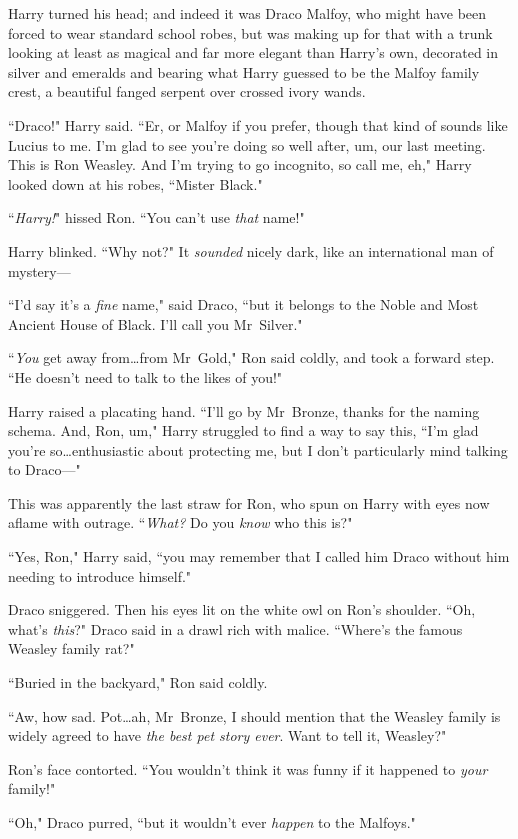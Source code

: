 Harry turned his head; and indeed it was Draco Malfoy, who might have been forced to wear standard school robes, but was making up for that with a trunk looking at least as magical and far more elegant than Harry's own, decorated in silver and emeralds and bearing what Harry guessed to be the Malfoy family crest, a beautiful fanged serpent over crossed ivory wands.

``Draco!" Harry said. ``Er, or Malfoy if you prefer, though that kind of sounds like Lucius to me. I'm glad to see you're doing so well after, um, our last meeting. This is Ron Weasley. And I'm trying to go incognito, so call me, eh," Harry looked down at his robes, ``Mister Black."

``\emph{Harry!}" hissed Ron. ``You can't use \emph{that} name!"

Harry blinked. ``Why not?" It \emph{sounded} nicely dark, like an international man of mystery—

``I'd say it's a \emph{fine} name," said Draco, ``but it belongs to the Noble and Most Ancient House of Black. I'll call you Mr~Silver."

``\emph{You} get away from…from Mr~Gold," Ron said coldly, and took a forward step. ``He doesn't need to talk to the likes of you!"

Harry raised a placating hand. ``I'll go by Mr~Bronze, thanks for the naming schema. And, Ron, um," Harry struggled to find a way to say this, ``I'm glad you're so…enthusiastic about protecting me, but I don't particularly mind talking to Draco—"

This was apparently the last straw for Ron, who spun on Harry with eyes now aflame with outrage. ``\emph{What?} Do you \emph{know} who this is?"

``Yes, Ron," Harry said, ``you may remember that I called him Draco without him needing to introduce himself."

Draco sniggered. Then his eyes lit on the white owl on Ron's shoulder. ``Oh, what's \emph{this}?" Draco said in a drawl rich with malice. ``Where's the famous Weasley family rat?"

``Buried in the backyard," Ron said coldly.

``Aw, how sad. Pot…ah, Mr~Bronze, I should mention that the Weasley family is widely agreed to have \emph{the best pet story ever}. Want to tell it, Weasley?"

Ron's face contorted. ``You wouldn't think it was funny if it happened to \emph{your} family!"

``Oh," Draco purred, ``but it wouldn't ever \emph{happen} to the Malfoys."

